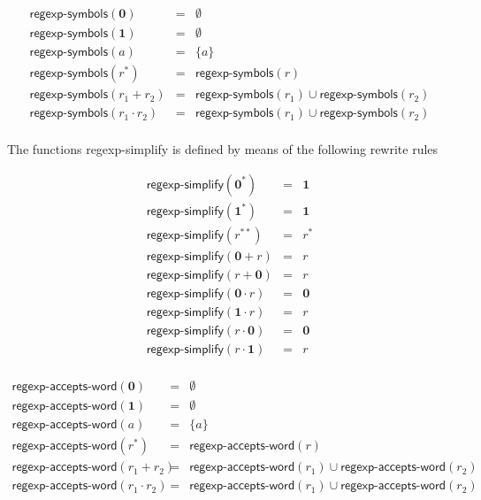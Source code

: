 \documentclass[11pt]{article}
\begin{document}
\begin{equation*}
\begin{array}{lll}
\textsf{regexp-symbols}(\textbf{0}) &=& \emptyset \\
\textsf{regexp-symbols}(\textbf{1}) &=& \emptyset \\
\textsf{regexp-symbols}(a) &=& \{ a \} \\
\textsf{regexp-symbols}(r^*) &=& \textsf{regexp-symbols}(r) \\
\textsf{regexp-symbols}(r_1 + r_2) &=& \textsf{regexp-symbols}(r_1) \cup \textsf{regexp-symbols}(r_2) \\
\textsf{regexp-symbols}(r_1 \cdot r_2) &=& \textsf{regexp-symbols}(r_1) \cup \textsf{regexp-symbols}(r_2) \\
\end{array}
\end{equation*}

The functions \textsf{regexp-simplify} is defined by means of the following rewrite rules

\begin{equation*}
\begin{array}{lll}
\textsf{regexp-simplify}(\textbf{0}^*) &=& \textbf{1} \\
\textsf{regexp-simplify}(\textbf{1}^*) &=& \textbf{1} \\
\textsf{regexp-simplify}(r^{**}) &=& r^* \\
\textsf{regexp-simplify}(\textbf{0} + r) &=& r \\
\textsf{regexp-simplify}(r + \textbf{0}) &=& r \\
\textsf{regexp-simplify}(\textbf{0} \cdot r) &=& \textbf{0} \\
\textsf{regexp-simplify}(\textbf{1} \cdot r) &=& r \\
\textsf{regexp-simplify}(r \cdot \textbf{0}) &=& \textbf{0} \\
\textsf{regexp-simplify}(r \cdot \textbf{1}) &=& r \\
\end{array}
\end{equation*}

\begin{equation*}
\begin{array}{lll}
\textsf{regexp-accepts-word}(\textbf{0}) &=& \emptyset \\
\textsf{regexp-accepts-word}(\textbf{1}) &=& \emptyset \\
\textsf{regexp-accepts-word}(a) &=& \{ a \} \\
\textsf{regexp-accepts-word}(r^*) &=& \textsf{regexp-accepts-word}(r) \\
\textsf{regexp-accepts-word}(r_1 + r_2) &=& \textsf{regexp-accepts-word}(r_1) \cup \textsf{regexp-accepts-word}(r_2) \\
\textsf{regexp-accepts-word}(r_1 \cdot r_2) &=& \textsf{regexp-accepts-word}(r_1) \cup \textsf{regexp-accepts-word}(r_2) \\
\end{array}
\end{equation*}
\end{document}
